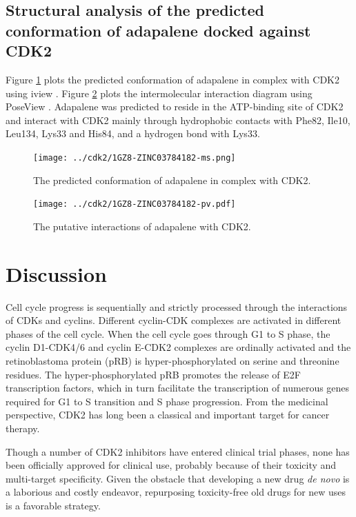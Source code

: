 \documentclass[10pt]{article}
\begin{document}
\subsection*{Structural analysis of the predicted conformation of adapalene docked against CDK2}

Figure \ref{1GZ8-ZINC03784182-ms} plots the predicted conformation of adapalene in complex with CDK2 using iview \citep{1366}. Figure \ref{1GZ8-ZINC03784182-pv} plots the intermolecular interaction diagram using PoseView \citep{748}. Adapalene was predicted to reside in the ATP-binding site of CDK2 and interact with CDK2 mainly through hydrophobic contacts with Phe82, Ile10, Leu134, Lys33 and His84, and a hydrogen bond with Lys33.

\begin{figure}
\centering
\texttt{[image: ../cdk2/1GZ8-ZINC03784182-ms.png]}
\caption{The predicted conformation of adapalene in complex with CDK2.}
\label{1GZ8-ZINC03784182-ms}
\end{figure}

\begin{figure}
\centering
\texttt{[image: ../cdk2/1GZ8-ZINC03784182-pv.pdf]}
\caption{The putative interactions of adapalene with CDK2.}
\label{1GZ8-ZINC03784182-pv}
\end{figure}

\section*{Discussion}

Cell cycle progress is sequentially and strictly processed through the interactions of CDKs and cyclins. Different cyclin-CDK complexes are activated in different phases of the cell cycle. When the cell cycle goes through G1 to S phase, the cyclin D1-CDK4/6 and cyclin E-CDK2 complexes are ordinally activated and the retinoblastoma protein (pRB) is hyper-phosphorylated on serine and threonine residues. The hyper-phosphorylated pRB promotes the release of E2F transcription factors, which in turn facilitate the transcription of numerous genes required for G1 to S transition and S phase progression. From the medicinal perspective, CDK2 has long been a classical and important target for cancer therapy.

Though a number of CDK2 inhibitors have entered clinical trial phases, none has been officially approved for clinical use, probably because of their toxicity and multi-target specificity. Given the obstacle that developing a new drug \textit{de novo} is a laborious and costly endeavor, repurposing toxicity-free old drugs for new uses is a favorable strategy.
\end{document}
